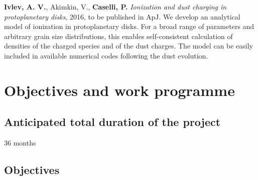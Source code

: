 \documentclass[10pt,fleqn,twoside]{article}
\begin{document}
\begin{literature}
\item \textbf{Ivlev, A. V.}, Akimkin, V., \textbf{Caselli, P.}
  \textit{Ionization and dust charging in protoplanetary disks}, 2016,
  to be published in ApJ. We develop an analytical model of ionization
  in protoplanetary disks. For a broad range of parameters and
  arbitrary grain size distributions, this enables self-consistent
  calculation of densities of the charged species and of the dust
  charges. The model can be easily included in available numerical
  codes following the dust evolution. 


\end{literature}

% 
% 
% 
% 
% 
% 
% 

\section{Objectives and work programme}
\renewcommand{\leftmark}{\sc Objectives and work programme}

\subsection{Anticipated total duration of the project}

36 months

\subsection{Objectives}
\end{document}
